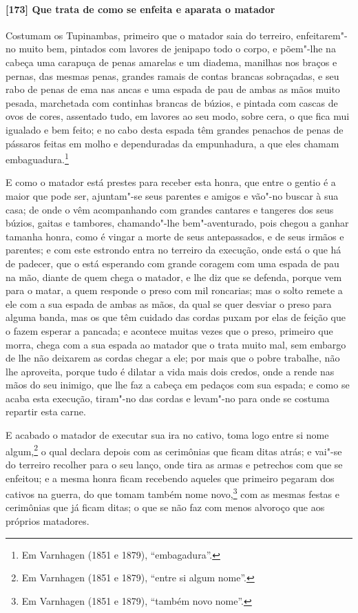\paragraph{[173] Que trata de como se enfeita e aparata o matador}\quad
Costumam os Tupinambas, primeiro que o matador saia do terreiro, enfeitarem"-no muito bem,
pintados com lavores de jenipapo todo o corpo, e põem"-lhe na cabeça uma carapuça de penas
amarelas e um diadema, manilhas nos braços e pernas, das mesmas penas, grandes ramais de
contas brancas sobraçadas, e seu rabo de penas de ema nas ancas e uma espada de pau de
ambas as mãos muito pesada, marchetada com continhas brancas de búzios, e pintada com
cascas de ovos de cores, assentado tudo, em lavores ao seu modo, sobre cera, o que fica
mui igualado e bem feito; e no cabo desta espada têm grandes penachos de penas de pássaros
feitas em molho e dependuradas da empunhadura, a que eles chamam embaguadura.\footnote{ Em
Varnhagen (1851 e 1879), ``embagadura''.}

E como o matador está prestes para receber esta honra, que entre o gentio é a maior que
pode ser, ajuntam"-se seus parentes e amigos e vão"-no buscar à sua casa; de onde o vêm
acompanhando com grandes cantares e tangeres dos seus búzios, gaitas e tambores,
chamando"-lhe bem"-aventurado, pois chegou a ganhar tamanha honra, como é vingar a morte de
seus antepassados, e de seus irmãos e parentes; e com este estrondo entra no terreiro da
execução, onde está o que há de padecer, que o está esperando com grande coragem com uma
espada de pau na mão, diante de quem chega o matador, e lhe diz que se defenda, porque vem
para o matar, a quem responde o preso com mil roncarias; mas o solto remete a ele com a
sua espada de ambas as mãos, da qual se quer desviar o preso para alguma banda, mas os que
têm cuidado das cordas puxam por elas de feição que o fazem esperar a pancada; e acontece
muitas vezes que o preso, primeiro que morra, chega com a sua espada ao matador que o
trata muito mal, sem embargo de lhe não deixarem as cordas chegar a ele; por mais que o
pobre trabalhe, não lhe aproveita, porque tudo é dilatar a vida mais dois credos, onde a
rende nas mãos do seu inimigo, que lhe faz a cabeça em pedaços com sua espada; e como se
acaba esta execução, tiram"-no das cordas e levam"-no para onde se costuma repartir esta
carne.

E acabado o matador de executar sua ira no cativo, toma logo entre si nome
algum,\footnote{ Em Varnhagen (1851 e 1879), ``entre si algum nome''.} o qual declara
depois com as cerimônias que ficam ditas atrás; e vai"-se do terreiro recolher para o seu
lanço, onde tira as armas e petrechos com que se enfeitou; e a mesma honra ficam recebendo
aqueles que primeiro pegaram dos cativos na guerra, do que tomam também nome
novo,\footnote{ Em Varnhagen (1851 e 1879), ``também novo nome''.} com as mesmas festas e
cerimônias que já ficam ditas; o que se não faz com menos alvoroço que aos próprios
matadores.

